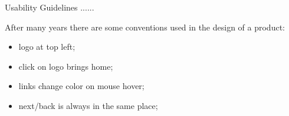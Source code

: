 \documentclass[12pt]{article}
\begin{document}
Usability Guidelines ......

After many years there are some conventions used in the design of a product: 
\begin{itemize}
  \item logo at top left;
  \item click on logo brings home;
  \item links change color on mouse hover;
  \item next/back is always in the same place;
\end{itemize}





















\newpage
\end{document}
